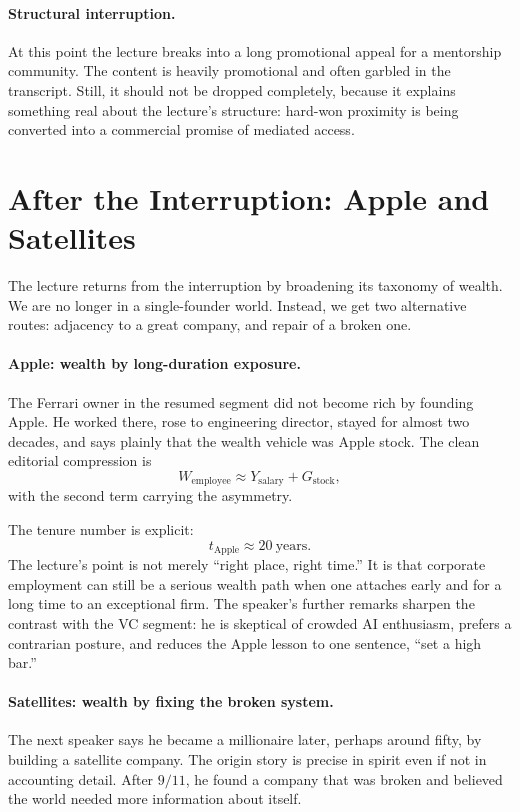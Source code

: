 \paragraph{Structural interruption.} At this point the lecture breaks into a long promotional appeal for a mentorship community. The content is heavily promotional and often garbled in the transcript. Still, it should not be dropped completely, because it explains something real about the lecture's structure: hard-won proximity is being converted into a commercial promise of mediated access.

\section{After the Interruption: Apple and Satellites}

The lecture returns from the interruption by broadening its taxonomy of wealth. We are no longer in a single-founder world. Instead, we get two alternative routes: adjacency to a great company, and repair of a broken one.

\paragraph{Apple: wealth by long-duration exposure.} The Ferrari owner in the resumed segment did not become rich by founding Apple. He worked there, rose to engineering director, stayed for almost two decades, and says plainly that the wealth vehicle was Apple stock. The clean editorial compression is
\begin{equation}
W_{\text{employee}} \approx Y_{\text{salary}} + G_{\text{stock}},
\end{equation}
with the second term carrying the asymmetry.

The tenure number is explicit:
\begin{equation}
t_{\text{Apple}} \approx 20 \ \text{years}.
\end{equation}
The lecture's point is not merely ``right place, right time.'' It is that corporate employment can still be a serious wealth path when one attaches early and for a long time to an exceptional firm. The speaker's further remarks sharpen the contrast with the VC segment: he is skeptical of crowded AI enthusiasm, prefers a contrarian posture, and reduces the Apple lesson to one sentence, ``set a high bar.''

\paragraph{Satellites: wealth by fixing the broken system.} The next speaker says he became a millionaire later, perhaps around fifty, by building a satellite company. The origin story is precise in spirit even if not in accounting detail. After \(9/11\), he found a company that was broken and believed the world needed more information about itself.

